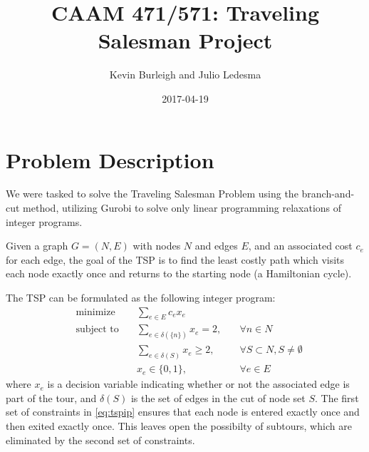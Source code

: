 \documentclass{article}
\title{CAAM 471/571: Traveling Salesman Project}
\date{2017-04-19}
\author{Kevin Burleigh and Julio Ledesma}
\begin{document}
\maketitle


\section{Problem Description}
\begin{flushleft}

We were tasked
to solve the Traveling Salesman Problem
using the branch-and-cut method,
utilizing Gurobi
to solve only linear programming relaxations
of integer programs.

Given a graph $G = (N,E)$ with nodes $N$ and edges $E$,
and an associated cost $c_e$ for each edge,
the goal of the TSP
is to find the least costly path
which visits each node exactly once
and returns to the starting node
(a Hamiltonian cycle).

The TSP can be formulated
as the following integer program:
\begin{equation} \label{eq:tspip}
\begin{alignedat}{3}
 & \text{minimize}         & \sum_{e \in E}{c_e x_e} & \\
 & \text{subject to} \quad & \sum_{e \in \delta(\{n\})}{x_e} = 2, \quad & \forall n \in N \\
 &                   \quad & \sum_{e \in \delta(S)}{x_e} \geq 2,  \quad & \forall S \subset N, S \neq \emptyset \\
 &                         & x_e \in \{ 0,1 \}, \quad                     & \forall e \in E
\end{alignedat}
\end{equation}
where $x_e$ is a decision variable
indicating whether or not
the associated edge is part of the tour,
and $\delta(S)$ is the set of edges
in the cut of node set $S$.
The first set of constraints in \eqref{eq:tspip}
ensures that each node
is entered exactly once
and then exited exactly once.
This leaves open the possibilty of subtours,
which are eliminated by the second set of constraints.

\end{flushleft}
\end{document}
